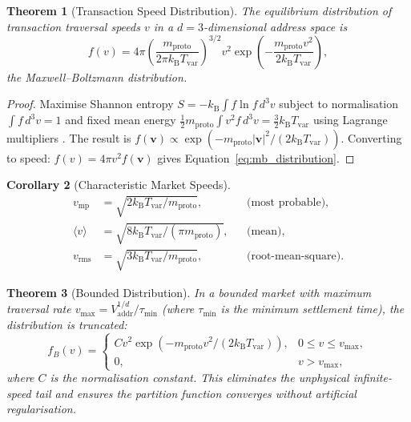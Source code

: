 \documentclass[twocolumn,10pt]{article}
\newtheorem{theorem}{Theorem}[section]
\newtheorem{corollary}[theorem]{Corollary}
\theoremstyle{remark}
\newcommand{\kB}{k_{\mathrm{B}}}
\newcommand{\Tvar}{T_{\mathrm{var}}}
\newcommand{\Vaddr}{V_{\mathrm{addr}}}
\newcommand{\mproto}{m_{\mathrm{proto}}}
\newcommand{\eqnref}[1]{Equation~\ref{#1}}
\begin{document}
\begin{theorem}[Transaction Speed Distribution]
\label{thm:mb_distribution}
The equilibrium distribution of transaction traversal speeds $v$ in a $d=3$-dimensional address space is
\begin{equation}
    f(v) = 4\pi \left(\frac{\mproto}{2\pi \kB \Tvar}\right)^{3/2} v^2 \exp\!\left(-\frac{\mproto v^2}{2\kB \Tvar}\right),
    \label{eq:mb_distribution}
\end{equation}
the Maxwell--Boltzmann distribution.
\end{theorem}

\begin{proof}
Maximise Shannon entropy $S = -\kB \int f \ln f \, d^3v$ subject to normalisation $\int f \, d^3v = 1$ and fixed mean energy $\frac{1}{2}\mproto \int v^2 f \, d^3v = \frac{3}{2}\kB\Tvar$ using Lagrange multipliers \cite{jaynes1957}.  The result is $f(\mathbf{v}) \propto \exp(-\mproto |\mathbf{v}|^2 / (2\kB\Tvar))$.  Converting to speed: $f(v) = 4\pi v^2 f(\mathbf{v})$ gives \eqnref{eq:mb_distribution}.
\end{proof}

\begin{corollary}[Characteristic Market Speeds]
\label{cor:speeds}
\begin{align}
    v_{\mathrm{mp}} &= \sqrt{2\kB\Tvar / \mproto}, & & \text{(most probable)}, \\
    \langle v \rangle &= \sqrt{8\kB\Tvar / (\pi\mproto)}, & & \text{(mean)}, \\
    v_{\mathrm{rms}} &= \sqrt{3\kB\Tvar / \mproto}, & & \text{(root-mean-square)}.
\end{align}
\end{corollary}

\begin{theorem}[Bounded Distribution]
\label{thm:bounded_mb}
In a bounded market with maximum traversal rate $v_{\max} = \Vaddr^{1/d} / \tau_{\min}$ (where $\tau_{\min}$ is the minimum settlement time), the distribution is truncated:
\begin{equation}
    f_B(v) = \begin{cases} C v^2 \exp(-\mproto v^2 / (2\kB\Tvar)), & 0 \leq v \leq v_{\max}, \\ 0, & v > v_{\max}, \end{cases}
    \label{eq:bounded_mb}
\end{equation}
where $C$ is the normalisation constant.  This eliminates the unphysical infinite-speed tail and ensures the partition function converges without artificial regularisation.
\end{theorem}
\end{document}
